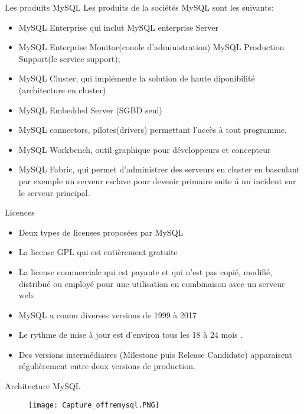 \documentclass{beamer}
\begin{document}
\begin{frame}{Les produits MySQL}
Les produits de la soci\'et\'es MySQL sont les suivants:
\begin{itemize}
\item MySQL Enterprise qui inclut MySQL enterprise Server
\item MySQL Enterprise Monitor(conole d'administration) MySQL Production Support(le service support);
\item MySQL Cluster, qui impl\'emente la solution de haute diponibilit\'e (architecture en cluster)
\item MySQL Embedded Server (SGBD seul)
\item MySQL connectors, pilotes(drivers) permettant l'acc\`es \`a tout programme.
\item MySQL Workbench, outil graphique pour d\'eveloppeurs et concepteur
\item MySQL Fabric, qui permet d'administrer des serveurs en cluster en basculant par exemple un serveur esclave pour devenir  primaire suite \'a un incident sur le serveur principal.

    
\end{itemize}
    
\end{frame}
\begin{frame}{Licences}
\begin{itemize}
\item Deux types de licenses propos\'ees par MySQL
\item La license GPL qui est enti\`erement gratuite
\item La license commerciale qui est payante et qui n'est pas copi\'e, modifi\'e, distribu\'e  ou employ\'e pour une utilisation en combinaison avec un serveur web.
\item MySQL a connu diverses versions de 1999 \`a 2017
\item Le rythme de mise \`a jour est d'environ tous les 18 \`a 24 mois .
\item Des versions interm\'ediaires (Milestone puis Release Candidate) apparaisent r\'eguli\`erement entre deux versions de production.
\end{itemize}
    
\end{frame}
\begin{frame}{Architecture MySQL}
   \begin{figure}[h]
\centering	
 \texttt{[image: Capture\_offremysql.PNG]}
\end{figure}
    
\end{frame}
\end{document}
